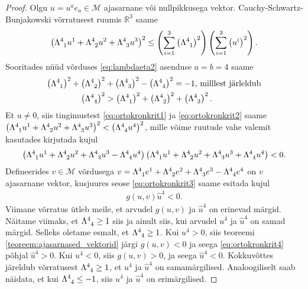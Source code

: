 \documentclass[a4paper,12pt]{article}
\theoremstyle{plain}
\theoremstyle{definition}
\numberwithin{equation}{section}
\begin{document}
\begin{proof}
Olgu $u = u^a e_a \in \mathcal{M}$ ajasarnane või nullpikkusega vektor. Cauchy-Schwartz-Bunjakowski võrratusest ruumis $\mathbb{R}^{3}$ saame
\begin{align} \label{eq:ortokronkrit1}
\left(\Lambda\indices{^4_1} u^1 + \Lambda\indices{^4_2} u^2 + \Lambda\indices{^4_3} u^3\right)^2 \leq \left(\sum_{i = 1}^{3} \left(\Lambda\indices{^4_1}\right)^2 \right) \left(\sum_{i = 1}^{3} \left(u^i\right)^2 \right).
\end{align}
Sooritades nüüd võrduses \ref{eq:lambdaeta2} asenduse $a = b = 4$ saame
\begin{align} \label{eq:ortokronkrit2}
\left(\Lambda\indices{^4_1}\right)^2 + \left(\Lambda\indices{^4_2}\right)^2 &+ \left(\Lambda\indices{^4_3}\right)^2 - \left(\Lambda\indices{^4_4}\right)^2 = -1 \text{, milllest järleldub} \nonumber \\
\left(\Lambda\indices{^4_4}\right)^2 &> \left(\Lambda\indices{^4_1}\right)^2 + \left(\Lambda\indices{^4_2}\right)^2 + \left(\Lambda\indices{^4_3}\right)^2.
\end{align}
Et $u \neq 0$, siis tingimustest \ref{eq:ortokronkrit1} ja \ref{eq:ortokronkrit2} saame $\left(\Lambda\indices{^4_1} u^1 + \Lambda\indices{^4_2} u^2 + \Lambda\indices{^4_3} u^3\right)^2 < \left(\Lambda\indices{^4_4} u^4\right)^2$, mille võime ruutude vahe valemit kasutades kirjutada kujul
\begin{align} \label{eq:ortokronkrit3}
\left(\Lambda\indices{^4_1} u^1 + \Lambda\indices{^4_2} u^2 + \Lambda\indices{^4_3} u^3 - \Lambda\indices{^4_4} u^4\right)\left(\Lambda\indices{^4_1} u^1 + \Lambda\indices{^4_2} u^2 + \Lambda\indices{^4_3} u^3 + \Lambda\indices{^4_4} u^4\right) < 0.
\end{align}
Defineerides $v \in \mathcal{M}$ võrdusega $v = \Lambda\indices{^4_1} e^1 + \Lambda\indices{^4_2} e^2 + \Lambda\indices{^4_3} e^3 - \Lambda\indices{^4_4} e^4$ on $v$ ajasarnane vektor, kusjuures seose \ref{eq:ortokronkrit3} saame esitada kujul
\begin{align} \label{eq:ortokronkrit4}
g\left(u , v\right)\hat{u}^4 < 0.
\end{align}
Viimane võrratus ütleb meile, et arvudel $g\left(u,v\right)$ ja $\hat{u}^4$ on erinevad märgid.
Näitame viimaks, et $\Lambda\indices{^4_4} \geq 1$ siis ja ainult siis, kui arvudel $u^4$ ja $\hat{u}^4$ on samad märgid.
Selleks oletame esmalt, et $\Lambda\indices{^4_4} \geq 1$. Kui $u^4 > 0$, siis teoreemi \ref{teoreem:ajasarnased_vektorid} järgi $g\left(u, v\right) < 0$ ja seega \ref{eq:ortokronkrit4} põhjal $\hat{u}^4 >0$. Kui $u^4 < 0$, siis $g\left(u, v\right) > 0$, ja seega $\hat{u}^4 < 0$. Kokkuvõttes järeldub võrratusest $\Lambda\indices{^4_4} \geq 1$, et $u^4$ ja $\hat{u}^4$ on samamärgilised. Analoogiliselt saab näidata, et kui $\Lambda\indices{^4_4} \leq -1$, siis $u^4$ ja $\hat{u}^4$ on erimärgilised.
\end{proof}
\end{document}
